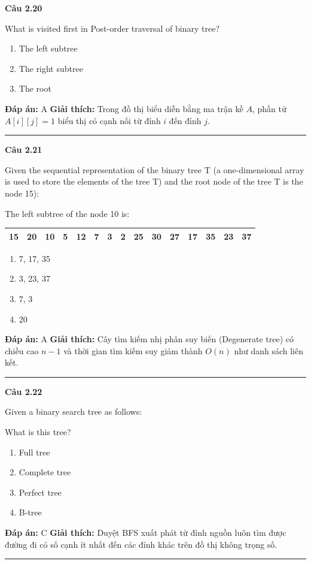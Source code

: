 \documentclass[11pt,a4paper]{article}
\newenvironment{question}[1]{%
  \par\vspace{1em}\noindent\textbf{\large Câu #1}\par\vspace{0.4em}
}{%
  \par\vspace{1em}\hrule\vspace{0.6em}
}
\newenvironment{choices}{%
  \begin{enumerate}[label=\textbf{\Alph*.},leftmargin=2.2em,itemsep=2pt,topsep=3pt]
}{%
  \end{enumerate}
}
\newcommand{\choice}{\item}
\begin{document}
\begin{question}{2.20}
What is visited first in Post-order traversal of binary tree?
\begin{choices}
\choice The left subtree
\choice The right subtree
\choice The root
\end{choices}
\textbf{Đáp án:} A
\textbf{Giải thích:} Trong đồ thị biểu diễn bằng ma trận kề $A$, phần tử $A[i][j] = 1$ biểu thị có cạnh nối từ đỉnh $i$ đến đỉnh $j$.
\end{question}

\begin{question}{2.21}
Given the sequential representation of the binary tree T (a one-dimensional array is used to store the elements of the tree T) and the root node of the tree T is the node 15):

The left subtree of the node 10 is:
\begin{center}
\begin{tabular}{|c|c|c|c|c|c|c|c|c|c|c|c|c|c|c|}
\hline
15 & 20 & 10 & 5 & 12 & 7 & 3 & 2 & 25 & 30 & 27 & 17 & 35 & 23 & 37 \\
\hline
\end{tabular}
\end{center}
\begin{choices}
\choice 7, 17, 35
\choice 3, 23, 37
\choice 7, 3
\choice 20
\end{choices}
\textbf{Đáp án:} A
\textbf{Giải thích:} Cây tìm kiếm nhị phân suy biến (Degenerate tree) có chiều cao $n - 1$ và thời gian tìm kiếm suy giảm thành $O(n)$ như danh sách liên kết.
\end{question}

\begin{question}{2.22}
Given a binary search tree as follows:
\begin{center}
\end{center}
What is this tree?
\begin{choices}
\choice Full tree
\choice Complete tree
\choice Perfect tree
\choice B-tree
\end{choices}
\textbf{Đáp án:} C
\textbf{Giải thích:} Duyệt BFS xuất phát từ đỉnh nguồn luôn tìm được đường đi có số cạnh ít nhất đến các đỉnh khác trên đồ thị không trọng số.
\end{question}
\end{document}
